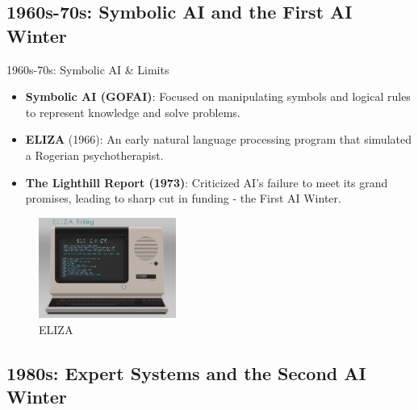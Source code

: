 \documentclass{beamer}
\begin{document}
\subsection{1960s-70s: Symbolic AI and the First AI Winter}

\begin{frame}[t]{1960s-70s: Symbolic AI \& Limits}
\begin{itemize}
    \item \textbf{Symbolic AI (GOFAI)}: Focused on manipulating symbols and logical rules to represent knowledge and solve problems.
    \item \textbf{ELIZA} (1966): An early natural language processing program that simulated a Rogerian psychotherapist.
    \item \textbf{The Lighthill Report (1973)}: Criticized AI's failure to meet its grand promises, leading to sharp cut in funding - the \alert{First AI Winter}.
\end{itemize}
\begin{figure}
    \includegraphics[width=0.4\textwidth]{images/eliza.png}
    \caption{ELIZA}
\end{figure}
\end{frame}

\subsection{1980s: Expert Systems and the Second AI Winter}
\end{document}
